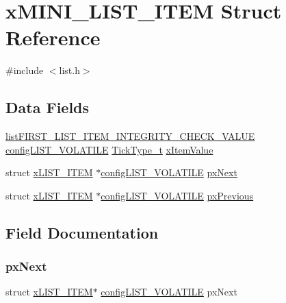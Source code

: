 \hypertarget{structx_m_i_n_i___l_i_s_t___i_t_e_m}{}\section{x\+M\+I\+N\+I\+\_\+\+L\+I\+S\+T\+\_\+\+I\+T\+EM Struct Reference}
\label{structx_m_i_n_i___l_i_s_t___i_t_e_m}


{\ttfamily \#include $<$list.\+h$>$}

\subsection*{Data Fields}
\begin{DoxyCompactItemize}
\item 
\mbox{\hyperlink{list_8h_a3611bd5d5d87cb26ac1dc7a4852b94a0}{list\+F\+I\+R\+S\+T\+\_\+\+L\+I\+S\+T\+\_\+\+I\+T\+E\+M\+\_\+\+I\+N\+T\+E\+G\+R\+I\+T\+Y\+\_\+\+C\+H\+E\+C\+K\+\_\+\+V\+A\+L\+UE}} \mbox{\hyperlink{list_8h_a2d5de557c5561c8980d1bf51d87d8cba}{config\+L\+I\+S\+T\+\_\+\+V\+O\+L\+A\+T\+I\+LE}} \mbox{\hyperlink{portmacro_8h_aa69c48c6e902ce54f70886e6573c92a9}{Tick\+Type\+\_\+t}} \mbox{\hyperlink{structx_m_i_n_i___l_i_s_t___i_t_e_m_aa6f3caf3e73107fb0da6fede4b06f104}{x\+Item\+Value}}
\item 
struct \mbox{\hyperlink{structx_l_i_s_t___i_t_e_m}{x\+L\+I\+S\+T\+\_\+\+I\+T\+EM}} $\ast$\mbox{\hyperlink{list_8h_a2d5de557c5561c8980d1bf51d87d8cba}{config\+L\+I\+S\+T\+\_\+\+V\+O\+L\+A\+T\+I\+LE}} \mbox{\hyperlink{structx_m_i_n_i___l_i_s_t___i_t_e_m_a77927cd93dda0c59b3855aca58881ca1}{px\+Next}}
\item 
struct \mbox{\hyperlink{structx_l_i_s_t___i_t_e_m}{x\+L\+I\+S\+T\+\_\+\+I\+T\+EM}} $\ast$\mbox{\hyperlink{list_8h_a2d5de557c5561c8980d1bf51d87d8cba}{config\+L\+I\+S\+T\+\_\+\+V\+O\+L\+A\+T\+I\+LE}} \mbox{\hyperlink{structx_m_i_n_i___l_i_s_t___i_t_e_m_a0294e93ecc18bcdb723038af1027505d}{px\+Previous}}
\end{DoxyCompactItemize}


\subsection{Field Documentation}
\mbox{\label{structx_m_i_n_i___l_i_s_t___i_t_e_m_a77927cd93dda0c59b3855aca58881ca1}} 
\subsubsection{\texorpdfstring{pxNext}{pxNext}}
{\footnotesize\ttfamily struct \mbox{\hyperlink{structx_l_i_s_t___i_t_e_m}{x\+L\+I\+S\+T\+\_\+\+I\+T\+EM}}$\ast$ \mbox{\hyperlink{list_8h_a2d5de557c5561c8980d1bf51d87d8cba}{config\+L\+I\+S\+T\+\_\+\+V\+O\+L\+A\+T\+I\+LE}} px\+Next}

